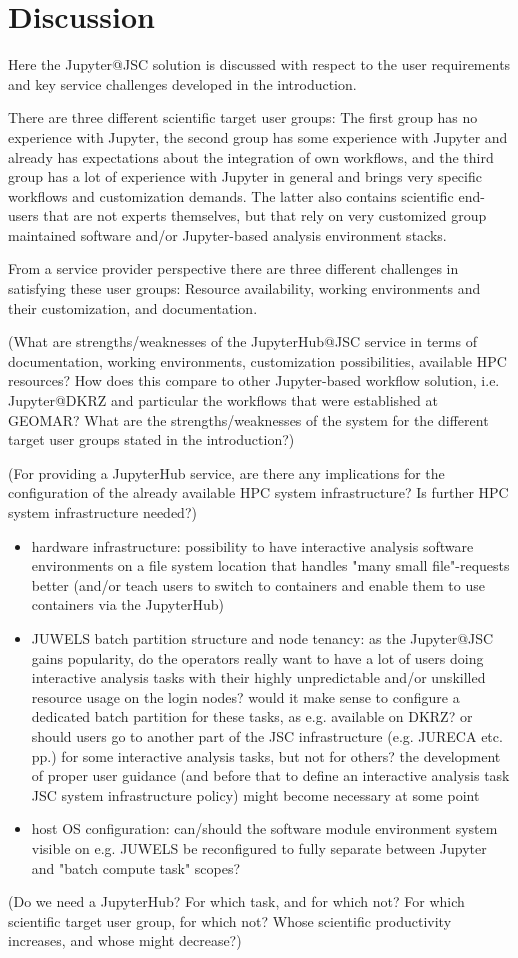 \section{Discussion}

Here the Jupyter@JSC solution is discussed with respect to the user requirements and key service challenges developed in the introduction.

There are three different scientific target user groups: The first group has no experience with Jupyter, the second group has some experience with Jupyter and already has expectations about the integration of own workflows, and the third group has a lot of experience with Jupyter in general and brings very specific workflows and customization demands.
The latter also contains scientific end-users that are not experts themselves, but that rely on very customized group maintained software and/or Jupyter-based analysis environment stacks.

From a service provider perspective there are three different challenges in satisfying these user groups: Resource availability, working environments and their customization, and documentation.

(What are strengths/weaknesses of the JupyterHub@JSC service in terms of documentation, working environments, customization possibilities, available HPC resources? How does this compare to other Jupyter-based workflow solution, i.e. Jupyter@DKRZ and particular the workflows that were established at GEOMAR? What are the strengths/weaknesses of the system for the different target user groups stated in the introduction?)

(For providing a JupyterHub service, are there any implications for the configuration of the already available HPC system infrastructure? Is further HPC system infrastructure needed?)

\begin{itemize}
  \item hardware infrastructure: possibility to have interactive analysis software environments on a file system location that handles "many small file"-requests better (and/or teach users to switch to containers and enable them to use containers via the JupyterHub)
  \item JUWELS batch partition structure and node tenancy: as the Jupyter@JSC gains popularity, do the operators really want to have a lot of users doing interactive analysis tasks with their highly unpredictable and/or unskilled resource usage on the login nodes? would it make sense to configure a dedicated batch partition for these tasks, as e.g. available on DKRZ? or should users go to another part of the JSC infrastructure (e.g. JURECA etc. pp.) for some interactive analysis tasks, but not for others? the development of proper user guidance (and before that to define an interactive analysis task JSC system infrastructure policy) might become necessary at some point
  \item host OS configuration: can/should the software module environment system visible on e.g. JUWELS be reconfigured to fully separate between Jupyter and "batch compute task" scopes?
\end{itemize}

(Do we need a JupyterHub? For which task, and for which not? For which scientific target user group, for which not? Whose scientific productivity increases, and whose might decrease?)
